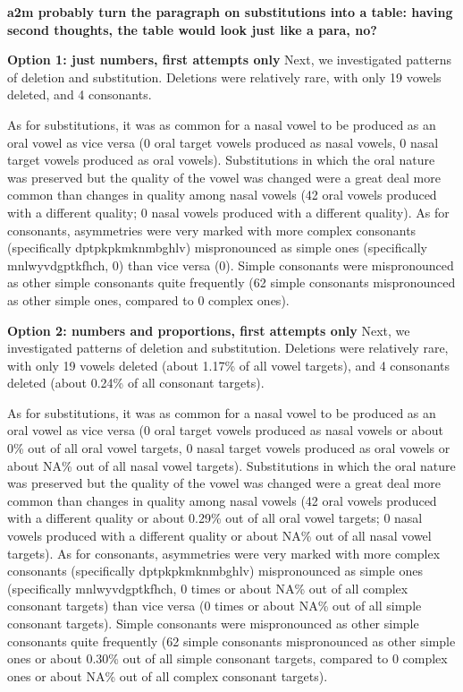 \documentclass[english,,man,floatsintext]{apa6}
\begin{document}
\textbf{a2m probably turn the paragraph on substitutions into a table:
having second thoughts, the table would look just like a para, no?}

\textbf{Option 1: just numbers, first attempts only } Next, we
investigated patterns of deletion and substitution. Deletions were
relatively rare, with only 19 vowels deleted, and 4 consonants.

As for substitutions, it was as common for a nasal vowel to be produced
as an oral vowel as vice versa (0 oral target vowels produced as nasal
vowels, 0 nasal target vowels produced as oral vowels). Substitutions in
which the oral nature was preserved but the quality of the vowel was
changed were a great deal more common than changes in quality among
nasal vowels (42 oral vowels produced with a different quality; 0 nasal
vowels produced with a different quality). As for consonants,
asymmetries were very marked with more complex consonants (specifically
dptpkpkmknmbghlv) mispronounced as simple ones (specifically
mnlwyvdgptkfhch, 0) than vice versa (0). Simple consonants were
mispronounced as other simple consonants quite frequently (62 simple
consonants mispronounced as other simple ones, compared to 0 complex
ones).

\textbf{Option 2: numbers and proportions, first attempts only} Next, we
investigated patterns of deletion and substitution. Deletions were
relatively rare, with only 19 vowels deleted (about 1.17\% of all vowel
targets), and 4 consonants deleted (about 0.24\% of all consonant
targets).

As for substitutions, it was as common for a nasal vowel to be produced
as an oral vowel as vice versa (0 oral target vowels produced as nasal
vowels or about 0\% out of all oral vowel targets, 0 nasal target vowels
produced as oral vowels or about NA\% out of all nasal vowel targets).
Substitutions in which the oral nature was preserved but the quality of
the vowel was changed were a great deal more common than changes in
quality among nasal vowels (42 oral vowels produced with a different
quality or about 0.29\% out of all oral vowel targets; 0 nasal vowels
produced with a different quality or about NA\% out of all nasal vowel
targets). As for consonants, asymmetries were very marked with more
complex consonants (specifically dptpkpkmknmbghlv) mispronounced as
simple ones (specifically mnlwyvdgptkfhch, 0 times or about NA\% out of
all complex consonant targets) than vice versa (0 times or about NA\%
out of all simple consonant targets). Simple consonants were
mispronounced as other simple consonants quite frequently (62 simple
consonants mispronounced as other simple ones or about 0.30\% out of all
simple consonant targets, compared to 0 complex ones or about NA\% out
of all complex consonant targets).
\end{document}
